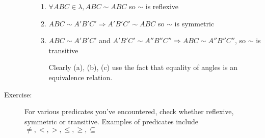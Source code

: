 \documentclass[10pt]{article}
\begin{document}
\begin{description}
\begin{enumerate}
			\begin{enumerate}
				\item $\forall ABC \in \lambda, ABC \sim ABC$ so $\sim$ is reflexive
				\item $ABC \sim A'B'C' \Rightarrow A'B'C' \sim ABC$ so $\sim$ is symmetric
				\item $ABC \sim A'B'C'$ and $A'B'C' \sim A''B''C'' \Rightarrow ABC \sim A''B''C''$, so $\sim$ is transitive
				\item[Clearly] (a), (b), (c) use the fact that equality of angles is an equivalence relation.
			\end{enumerate}
		\end{enumerate}
		\item[Exercise:] For various predicates you've encountered, check whether reflexive, symmetric or transitive. Examples of predicates include $\neq, <, >, \leq, \geq, \subseteq$
	\end{description}
	
\end{document}
